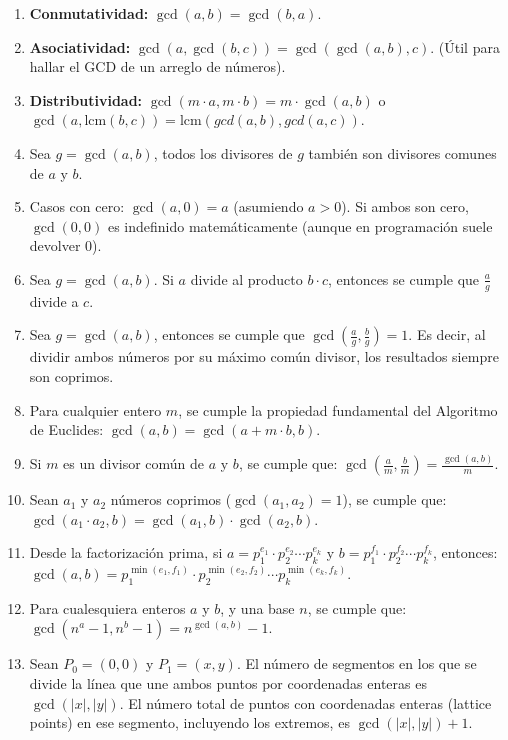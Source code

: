 \documentclass{article}
\begin{document}
\begin{enumerate}
    \item \textbf{Conmutatividad:} $\gcd(a,b) = \gcd(b,a)$.
    \item \textbf{Asociatividad:} $\gcd(a,\gcd(b,c)) = \gcd(\gcd(a,b),c)$. (Útil para hallar el GCD de un arreglo de números).
    \item \textbf{Distributividad:} $\gcd(m \cdot a, m \cdot b) = m \cdot \gcd(a,b)$ o $\gcd(a,\text{lcm}(b,c))=\text{lcm}(gcd(a,b),gcd(a,c))$.
    \item Sea $g = \gcd(a,b)$, todos los divisores de $g$ también son divisores comunes de $a$ y $b$.
    \item Casos con cero: $\gcd(a,0) = a$ (asumiendo $a > 0$). Si ambos son cero, $\gcd(0,0)$ es indefinido matemáticamente (aunque en programación suele devolver $0$).
    \item Sea $g = \gcd(a,b)$. Si $a$ divide al producto $b \cdot c$, entonces se cumple que $\frac{a}{g}$ divide a $c$.
    \item Sea $g = \gcd(a,b)$, entonces se cumple que $\gcd\left(\frac{a}{g}, \frac{b}{g}\right) = 1$. Es decir, al dividir ambos números por su máximo común divisor, los resultados siempre son coprimos.
    \item Para cualquier entero $m$, se cumple la propiedad fundamental del Algoritmo de Euclides: $\gcd(a,b) = \gcd(a + m \cdot b, b)$.
    \item Si $m$ es un divisor común de $a$ y $b$, se cumple que: $\gcd\left(\frac{a}{m}, \frac{b}{m}\right) = \frac{\gcd(a,b)}{m}$.
    \item Sean $a_1$ y $a_2$ números coprimos ($\gcd(a_1, a_2) = 1$), se cumple que: $\gcd(a_1 \cdot a_2, b) = \gcd(a_1, b) \cdot \gcd(a_2, b)$.
    \item Desde la factorización prima, si $a = p_1^{e_1} \cdot p_2^{e_2} \cdots p_k^{e_k}$ y $b = p_1^{f_1} \cdot p_2^{f_2} \cdots p_k^{f_k}$, entonces: $\gcd(a,b) = p_1^{\min(e_1,f_1)} \cdot p_2^{\min(e_2,f_2)} \cdots p_k^{\min(e_k,f_k)}$.
    \item Para cualesquiera enteros $a$ y $b$, y una base $n$, se cumple que: $\gcd(n^a - 1, n^b - 1) = n^{\gcd(a,b)} - 1$.
    \item Sean $P_0 = (0,0)$ y $P_1 = (x,y)$. El número de segmentos en los que se divide la línea que une ambos puntos por coordenadas enteras es $\gcd(|x|, |y|)$. El número total de puntos con coordenadas enteras (lattice points) en ese segmento, incluyendo los extremos, es $\gcd(|x|, |y|) + 1$.
\end{enumerate}
\end{document}
